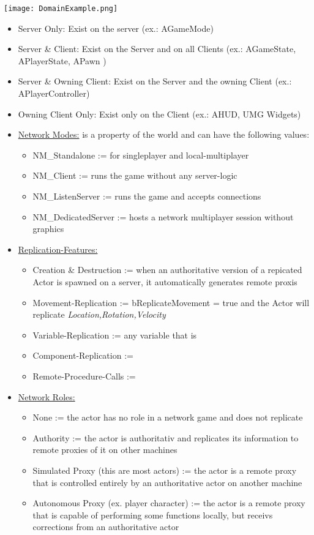         \texttt{[image: DomainExample.png]}
        \uline{}
        \begin{itemize}
            \item Server Only: Exist on the server (ex.: AGameMode)
            \item Server \& Client: Exist on the Server and on all Clients (ex.: AGameState, APlayerState, APawn )
            \item Server \& Owning Client: Exist on the Server and the owning Client (ex.: APlayerController)
            \item Owning Client Only: Exist only on the Client (ex.: AHUD, UMG Widgets)
        \end{itemize}
    \begin{itemize}
        \item \uline{Network Modes:} is a property of the world and can have the following values:
        \begin{itemize}
            \item NM\_Standalone := for singleplayer and local-multiplayer
            \item NM\_Client := runs the game without any server-logic
            \item NM\_ListenServer := runs the game and accepts connections
            \item NM\_DedicatedServer := hosts a network multiplayer session without graphics
        \end{itemize}
        \item \uline{Replication-Features:}
        \begin{itemize}
            \item Creation \& Destruction := when an authoritative version of a repicated Actor is spawned on a server, it automatically generates remote proxis
            \item Movement-Replication := bReplicateMovement = true and the Actor will replicate \textit{Location,Rotation,Velocity}
            \item Variable-Replication := any variable that is 
            \item Component-Replication := 
            \item Remote-Procedure-Calls := 
        \end{itemize}
        \item \uline{Network Roles:}
        \begin{itemize}
            \item None := the actor has no role in a network game and does not replicate
            \item Authority := the actor is authoritativ and replicates its information to remote proxies of it on other machines
            \item Simulated Proxy (this are most actors) := the actor is a remote proxy that is controlled entirely by an authoritative actor on another machine
            \item Autonomous Proxy (ex. player character) := the actor is a remote proxy that is capable of performing some functions locally, but receivs corrections from an authoritative actor
        \end{itemize}
    \end{itemize}

